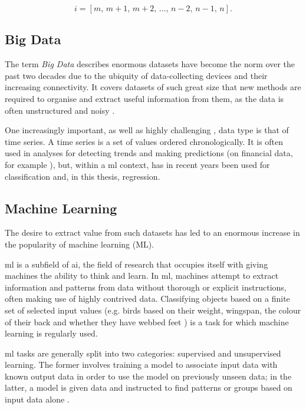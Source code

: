 \[
    i = \left[m,\,m+1,\,m+2,\,\ldots,\,n-2,\,n-1,\,n\right].
\]

\subsection{Big Data}
The term \textit{Big Data} describes enormous datasets have become the norm over the past two decades due to the ubiquity of data-collecting devices and their increasing connectivity. It covers datasets of such great size that new methods are required to organise and extract useful information from them, as the data is often unstructured and noisy \cite[]{fan_mining_2013,chen_big_2014}.

One increasingly important, as well as highly challenging \cite[]{yang_10_2006}, data type is that of time series. A time series is a set of values ordered chronologically. It is often used in analyses for detecting trends and making predictions (on financial data, for example \cite[]{krollner_financial_2010}), but, within a \ac{ml} context, has in recent years been used for classification \cite[]{dau_ucr_2019,ismail_fawaz_deep_2019} and, in this thesis, regression.

\subsection{Machine Learning}
The desire to extract value from such datasets has led to an enormous increase in the popularity of machine learning (ML).

\ac{ml} is a subfield of \ac{ai}, the field of research that occupies itself with giving machines the ability to think and learn. In \ac{ml}, machines attempt to extract information and patterns from data without thorough or explicit instructions, often making use of highly contrived data. Classifying objects based on a finite set of selected input values (e.g. birds based on their weight, wingspan, the colour of their back and whether they have webbed feet \cite[]{harrington_machine_2012}) is a task for which machine learning is regularly used.

\ac{ml} tasks are generally split into two categories: supervised and unsupervised learning. The former involves training a model to associate input data with known output data in order to use the model on previously unseen data; in the latter, a model is given data and instructed to find patterns or groups based on input data alone \cite[]{goodfellow_deep_2016,kelleher_fundamentals_2015}.

